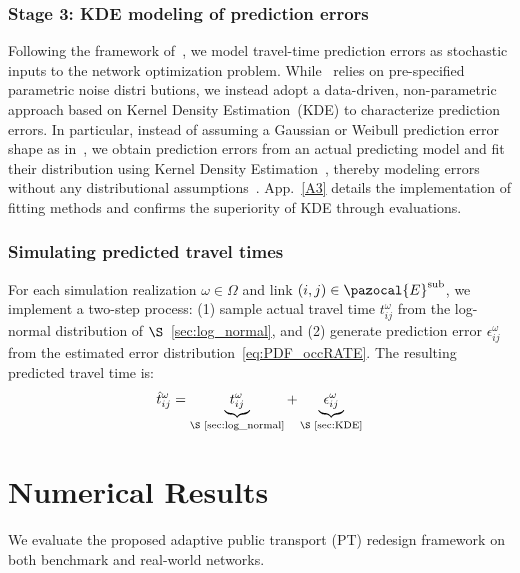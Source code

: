 \documentclass[a4paper,fleqn]{cas-sc}
\begin{document}
\subsubsection{Stage 3: KDE modeling of prediction errors}\label{sec:errorStage3}

Following the framework of~\citep{peled2021quality}, we model travel-time prediction errors as stochastic inputs to the network optimization problem.
While~\citet{peled2021quality} relies on pre-specified parametric noise distri
 butions, we instead adopt a data-driven, non-parametric approach based on Kernel Density Estimation~(KDE) to characterize prediction errors.
%
In particular, instead of assuming a Gaussian or Weibull prediction error shape as in~\citet{peled2021quality}, we obtain prediction errors from an actual predicting model and fit their distribution using Kernel Density Estimation~\citep{chen2017tutorial}, thereby modeling errors without any distributional assumptions~\citep{akritas2001non}. App.~\ref{A3} details the implementation of fitting methods and confirms the superiority of KDE through evaluations.

\subsubsection{Simulating predicted travel times}
For each simulation realization $\omega \in \Omega$ and link $(i,j) \in \pazocal{E}^{\text{sub}}$, we implement a two-step process: (1) sample actual travel time $t_{ij}^{\omega}$ from the log-normal distribution of $\S$~\ref{sec:log_normal}, and (2) generate prediction error $\epsilon_{ij}^{\omega}$ from the estimated error distribution~\eqref{eq:PDF_occRATE}. The resulting predicted travel time is:
\begin{equation}
    \hat{t}_{ij}^{\omega} = \underbrace{t_{ij}^{\omega}}_{\text{$\S$~\ref{sec:log_normal}}} + \underbrace{\epsilon_{ij}^{\omega}}_{\text{$\S$~\ref{sec:KDE}}}
    \label{eq:predTRAVEL}
\end{equation}


\section{Numerical Results}\label{sec:numericalRESULT}
We evaluate the proposed adaptive public transport (PT) redesign framework on both benchmark and real-world networks. 
\end{document}
